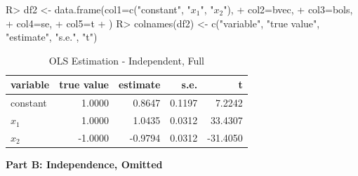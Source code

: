 \documentclass[11pt,reqno]{article}   %
\begin{document}
\begin{enumerate}
\begin{Schunk}
\begin{Sinput}
R> df2 <- data.frame(col1=c("constant", "$x_1$", "$x_2$"),
+                  col2=bvec,
+                  col3=bols,
+                  col4=se,
+                  col5=t
+                  )
R> colnames(df2) <- c("variable", "true value", "estimate", "s.e.", "t")
\end{Sinput}
\end{Schunk}
\begin{table}[!h]
\centering
\caption{OLS Estimation - Independent, Full} 
\begin{tabular}{lrrrr}
  \hline
variable & true value & estimate & s.e. & t \\ 
  \hline
constant & 1.0000 & 0.8647 & 0.1197 & 7.2242 \\ 
  $x_1$ & 1.0000 & 1.0435 & 0.0312 & 33.4307 \\ 
  $x_2$ & -1.0000 & -0.9794 & 0.0312 & -31.4050 \\ 
   \hline
\end{tabular}
\end{table}\end{enumerate}


\textbf{Part B: Independence, Omitted}
\end{document}
